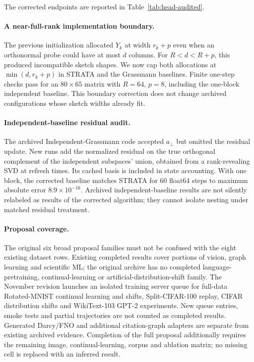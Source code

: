 The corrected endpoints are reported in Table~\ref{tab:head-audited}.


\paragraph{A near-full-rank implementation boundary.} The previous initialization allocated $Y_k$ at width $r_k+p$ even when an orthonormal probe could have at most $d$ columns. For $R<d<R+p$, this produced incompatible sketch shapes. We now cap both allocations at $\min(d,r_k+p)$ in STRATA and the Grassmann baselines. Finite one-step checks pass for an $80\times65$ matrix with $R=64$, $p=8$, including the one-block independent baseline. This boundary correction does not change archived configurations whose sketch widths already fit.

\paragraph{Independent-baseline residual audit.} The archived Independent-Grassmann code accepted $a_\perp$ but omitted the residual update. New runs add the normalized residual on the true orthogonal complement of the independent subspaces' union, obtained from a rank-revealing SVD at refresh times. Its cached basis is included in state accounting. With one block, the corrected baseline matches STRATA for 60 float64 steps to maximum absolute error $8.9\times10^{-16}$. Archived independent-baseline results are not silently relabeled as results of the corrected algorithm; they cannot isolate nesting under matched residual treatment.

\paragraph{Proposal coverage.}
The original six broad proposal families must not be confused with the eight existing dataset rows. Existing completed results cover portions of vision, graph learning and scientific ML; the original archive has no completed language-pretraining, continual-learning or artificial-distribution-shift family. The November revision launches an isolated training server queue for full-data Rotated-MNIST continual learning and shifts, Split-CIFAR-100 replay, CIFAR distribution shifts and WikiText-103 GPT-2 experiments. New queue entries, smoke tests and partial trajectories are not counted as completed results. Generated Darcy/FNO and additional citation-graph adapters are separate from existing archived evidence. Completion of the full proposal additionally requires the remaining image, continual-learning, corpus and ablation matrix; no missing cell is replaced with an inferred result.
